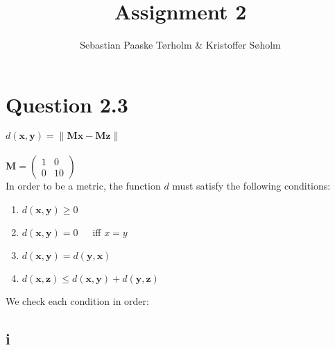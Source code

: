 \documentclass[11pt,a4paper]{article}
\title{Assignment 2}
\author{Sebastian Paaske Tørholm \& Kristoffer Søholm}
\begin{document}
\maketitle

\section{Question 2.3}
$d(\bm{x},\bm{y}) = \| \bm{Mx} - \bm{Mz} \|$ \\ \\
$\bm{M} = \begin{pmatrix} 1 & 0 \\ 0 & 10 \end{pmatrix}$ \\

In order to be a metric, the function $d$ must satisfy the following conditions:

\begin{enumerate}
    \item $d(\bm{x},\bm{y}) \geq 0$
    \item $d(\bm{x},\bm{y}) = 0$\ \ \ iff $x = y$
    \item $d(\bm{x},\bm{y}) = d(\bm{y},\bm{x})$
    \item $d(\bm{x},\bm{z}) \leq d(\bm{x},\bm{y}) + d(\bm{y},\bm{z})$
\end{enumerate}

We check each condition in order:

\subsection{i}
\end{document}
